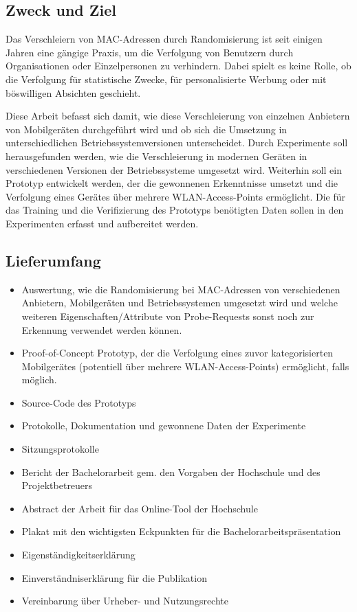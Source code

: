 \subsection*{Zweck und Ziel}
Das Verschleiern von MAC-Adressen durch Randomisierung ist seit einigen 
Jahren eine gängige Praxis, um die Verfolgung von Benutzern durch 
Organisationen oder Einzelpersonen zu verhindern. Dabei spielt es keine 
Rolle, ob die Verfolgung für statistische Zwecke, für personalisierte 
Werbung oder mit böswilligen Absichten geschieht.

Diese Arbeit befasst sich damit, wie diese Verschleierung von einzelnen 
Anbietern von Mobilgeräten durchgeführt wird und ob sich die Umsetzung
in unterschiedlichen Betriebssystemversionen unterscheidet. 
Durch Experimente soll herausgefunden werden, wie die Verschleierung 
in modernen Geräten in verschiedenen Versionen der Betriebssysteme 
umgesetzt wird. Weiterhin soll ein Prototyp entwickelt werden, 
der die gewonnenen Erkenntnisse umsetzt und die Verfolgung eines 
Gerätes über mehrere WLAN-Access-Points ermöglicht. Die für das 
Training und die Verifizierung des Prototyps benötigten Daten sollen 
in den Experimenten erfasst und aufbereitet werden.

\clearpage

\subsection*{Lieferumfang}
\begin{itemize}
	\item Auswertung, wie die Randomisierung bei MAC-Adressen von
	verschiedenen Anbietern, Mobilgeräten und Betriebssystemen umgesetzt
	wird und welche weiteren Eigenschaften/Attribute von Probe-Requests 
	sonst noch zur Erkennung verwendet werden können.
	\item Proof-of-Concept Prototyp, der die Verfolgung eines 
	zuvor kategorisierten Mobilgerätes (potentiell über mehrere 
	WLAN-Access-Points)	ermöglicht, falls möglich.
	\item Source-Code des Prototyps
	\item Protokolle, Dokumentation und gewonnene Daten der Experimente
	\item Sitzungsprotokolle
	\item Bericht der Bachelorarbeit gem. den Vorgaben der Hochschule 
	und des Projektbetreuers
	\item Abstract der Arbeit für das Online-Tool der Hochschule
	\item Plakat mit den wichtigsten Eckpunkten für die 
	Bachelorarbeitspräsentation
	\item Eigenständigkeitserklärung
	\item Einverständniserklärung für die Publikation
	\item Vereinbarung über Urheber- und Nutzungsrechte
\end{itemize} 

